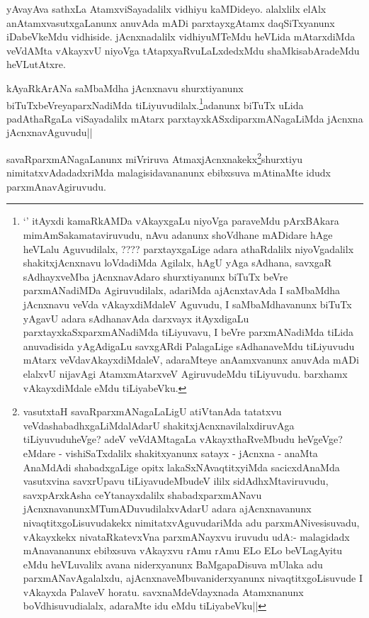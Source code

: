
\begin{artha}
yAvayAva sathxLa AtamxviSayadalilx vidhiyu kaMDideyo. alalxlilx elAlx anAtamxvasutxgaLanunx anuvAda mADi parxtayxgAtamx daqSiTxyanunx iDabeVkeMdu vidhiside. jAcnxnadalilx vidhiyuMTeMdu heVLida mAtarxdiMda veVdAMta vAkayxvU niyoVga tAtapxyaRvuLaLxdedxMdu shaMkisabAradeMdu heVLutAtxre. 
\end{artha}


\begin{artha}
kAyaRkArANa saMbaMdha jAcnxnavu shurxtiyanunx biTuTxbeVreyaparxNadiMda tiLiyuvudilalx.\footnote[1]{`\stext' itAyxdi kamaRkAMDa vAkayxgaLu niyoVga paraveMdu pArxBAkara mimAmSakamataviruvudu, nAvu adanunx shoVdhane mADidare hAge heVLalu Aguvudilalx, ????  parxtayxgaLige adara athaRdalilx niyoVgadalilx shakitxjAcnxnavu loVdadiMda Agilalx, hAgU yAga sAdhana, savxgaR sAdhayxveMba jAcnxnavAdaro shurxtiyanunx biTuTx beVre parxmANadiMDa Agiruvudilalx, adariMda ajAcnxtavAda I saMbaMdha jAcnxnavu veVda vAkayxdiMdaleV Aguvudu, I saMbaMdhavanunx biTuTx yAgavU adara sAdhanavAda darxvayx itAyxdigaLu parxtayxkaSxparxmANadiMda tiLiyuvavu, I beVre parxmANadiMda tiLida anuvadisida yAgAdigaLu savxgARdi PalagaLige sAdhanaveMdu tiLiyuvudu mAtarx veVdavAkayxdiMdaleV, adaraMteye anAamxvanunx anuvAda mADi elalxvU nijavAgi AtamxmAtarxveV AgiruvudeMdu tiLiyuvudu. barxhamx vAkayxdiMdale eMdu tiLiyabeVku.}adanunx biTuTx uLida padAthaRgaLa viSayadalilx mAtarx parxtayxkASxdiparxmANagaLiMda jAcnxna jAcnxnavAguvudu||
\end{artha}

\begin{artha}
savaRparxmANagaLanunx miVriruva AtmaxjAcnxnakekx\footnote[2]{vasutxtaH savaRparxmANagaLaLigU atiVtanAda tatatxvu veVdashabadhxgaLiMdalAdarU shakitxjAcnxnavilalxdiruvAga tiLiyuvuduheVge? adeV veVdAMtagaLa vAkayxthaRveMbudu heVgeVge? eMdare - vishiSaTxdalilx shakitxyanunx satayx - jAcnxna - anaMta AnaMdAdi shabadxgaLige opitx lakaSxNAvaqtitxyiMda sacicxdAnaMda vasutxvina savxrUpavu tiLiyavudeMbudeV ililx sidAdhxMtaviruvudu, savxpArxkAsha ceYtanayxdalilx shabadxparxmANavu jAcnxnavanunxMTumADuvudilalxvAdarU adara ajAcnxnavanunx nivaqtitxgoLisuvudakekx nimitatxvAguvudariMda adu parxmANivesisuvadu, vAkayxkekx nivataRkatevxVna parxmANayxvu iruvudu udA:- malagidadx mAnavananunx ebibxsuva vAkayxvu rAmu rAmu ELo ELo beVLagAyitu eMdu heVLuvalilx avana niderxyanunx BaMgapaDisuva mUlaka adu parxmANavAgalalxdu, ajAcnxnaveMbuvaniderxyanunx nivaqtitxgoLisuvude I vAkayxda PalaveV horatu. savxnaMdeVdayxnada Atamxnanunx boVdhisuvudialalx, adaraMte idu eMdu tiLiyabeVku||}shurxtiyu nimitatxvAdadadxriMda 
malagisidavananunx ebibxsuva mAtinaMte idudx parxmAnavAgiruvudu.
\end{artha}

